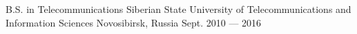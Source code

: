 


\begin{cventries}


\cventry
{B.S. in Telecommunications} %
{Siberian State University of Telecommunications and Information Sciences} %
{Novosibirsk, Russia} %
{Sept. 2010 --- 2016} %
{ %
}


\end{cventries}
